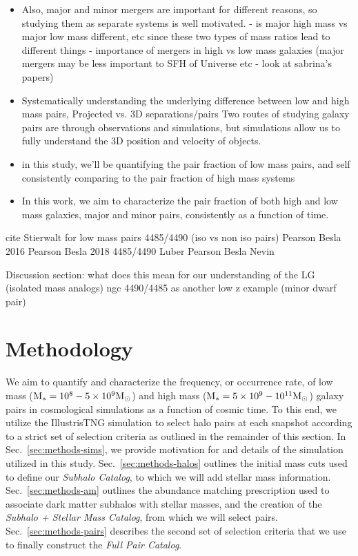 \documentclass[twocolumn]{aastex631}
\newcommand{\ms}[1]{\ensuremath{M_{*{#1}}}}
\newcommand{\subcat}{\textit{Subhalo Catalog}}
\newcommand{\starcat}{\textit{Subhalo + Stellar Mass Catalog}}
\newcommand{\paircat}{\textit{Full Pair Catalog}}
\begin{document}
\begin{itemize}
    \item Also, major and minor mergers are important for different reasons, so studying them as separate systems is well motivated.
        - is major high mass vs major low mass different, etc since these two types of mass ratios lead to different things 
        - importance of mergers in high vs low mass galaxies (major mergers may be less important to SFH of Universe etc - look at sabrina's papers)
    \item Systematically understanding the underlying difference between low and high mass pairs, Projected vs. 3D separations/pairs Two routes of studying galaxy pairs are through observations and simulations, but simulations allow us to fully understand the 3D position and velocity of objects. 
    \item in this study, we'll be quantifying the pair fraction of low mass pairs, and self consistently comparing to the pair fraction of high mass systems
    \item In this work, we aim to characterize the pair fraction of both high and low mass galaxies, major and minor pairs, consistently as a function of time. 
\end{itemize}
cite Stierwalt for low mass pairs 4485/4490 (iso vs non iso pairs) 
Pearson Besla 2016 
Pearson Besla 2018 4485/4490
Luber Pearson Besla 
Nevin 

Discussion section: 
what does this mean for our understanding of the LG (isolated mass analogs) 
ngc 4490/4485 as another low z example (minor dwarf pair) 


 \section{Methodology}\label{sec:methods}
We aim to quantify and characterize the frequency, or occurrence rate, of low mass ($\rm\ms{}=10^{8}-5\times 10^{9}\Msun$) and high mass ($\rm\ms{}=5\times10^{9}-10^{11}\Msun$) galaxy pairs in cosmological simulations as a function of cosmic time. 
To this end, we utilize the IllustrisTNG simulation to select halo pairs at each snapshot according to a strict set of selection criteria as outlined in the remainder of this section. 
In Sec.~\ref{sec:methods-sims}, we provide motivation for and details of the simulation utilized in this study.
Sec.~\ref{sec:methods-halos} outlines the initial mass cuts used to define our \subcat, to which we will 
add stellar mass information. %
Sec.~\ref{sec:methods-am} outlines the abundance matching prescription used to associate dark matter subhalos with stellar masses, and the creation of the \starcat, from which we will select pairs.
Sec.~\ref{sec:methods-pairs} describes the second set of selection criteria that we use to finally construct the \paircat. 
\end{document}

